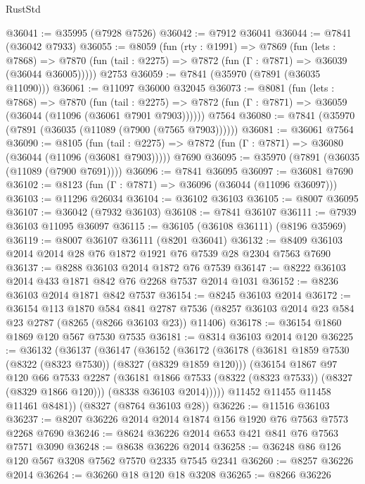\begin{lexlean}{RustStd}
\begin{coremodule}
{\begin{coremodule}
{{{{{{{{{{{{{{{{{{{{{{{{{{{{{{{{{{{{{{{{{{{{{{{{{{{{{{@36041 := @35995 (@7928 @7526)
@36042 := @7912 @36041
@36044 := @7841 (@36042 @7933)
@36055 := @8059
    (fun (rty : @1991) =>
    @7869
      (fun (lets : @7868) =>
      @7870 (fun (tail : @2275) => @7872 (fun (Γ : @7871) => @36039 (@36044 @36005)))))
    @2753
@36059 := @7841 (@35970 (@7891 (@36035 @11090)))
@36061 := @11097 @36000 @32045
@36073 := @8081
    (fun (lets : @7868) =>
    @7870
      (fun (tail : @2275) =>
      @7872 (fun (Γ : @7871) => @36059 (@36044 (@11096 (@36061 @7901 @7903))))))
    @7564
@36080 := @7841 (@35970 (@7891 (@36035 (@11089 (@7900 (@7565 @7903))))))
@36081 := @36061 @7564
@36090 := @8105
    (fun (tail : @2275) => @7872 (fun (Γ : @7871) => @36080 (@36044 (@11096 (@36081 @7903)))))
    @7690
@36095 := @35970 (@7891 (@36035 (@11089 (@7900 @7691))))
@36096 := @7841 @36095
@36097 := @36081 @7690
@36102 := @8123 (fun (Γ : @7871) => @36096 (@36044 (@11096 @36097)))
@36103 := @11296 @26034
@36104 := @36102 @36103
@36105 := @8007 @36095
@36107 := @36042 (@7932 @36103)
@36108 := @7841 @36107
@36111 := @7939 @36103 @11095 @36097
@36115 := @36105 (@36108 @36111) (@8196 @35969)
@36119 := @8007 @36107 @36111 (@8201 @36041)
@36132 := @8409 @36103 @2014 @2014 @28 @76 @1872 @1921 @76 @7539 @28 @2304 @7563 @7690
@36137 := @8288 @36103 @2014 @1872 @76 @7539
@36147 := @8222 @36103 @2014 @433 @1871 @842 @76 @2268 @7537 @2014 @1031
@36152 := @8236 @36103 @2014 @1871 @842 @7537
@36154 := @8245 @36103 @2014
@36172 := @36154
    @113
    @1870
    @584
    @841
    @2787
    @7536
    (@8257 @36103 @2014 @23 @584 @23 @2787 (@8265 (@8266 @36103 @23)) @11406)
@36178 := @36154 @1860 @1869 @120 @567 @7530 @7535
@36181 := @8314 @36103 @2014 @120
@36225 := @36132
    (@36137
      (@36147
        (@36152
          (@36172
            (@36178
              (@36181 @1859 @7530 (@8322 (@8323 @7530)) (@8327 (@8329 @1859 @120)))
              (@36154
                @1867
                @97
                @120
                @66
                @7533
                @2287
                (@36181 @1866 @7533 (@8322 (@8323 @7533)) (@8327 (@8329 @1866 @120)))
                (@8338 @36103 @2014)))))
        @11452
        @11455
        @11458
        @11461
        @8481))
    (@8327 (@8764 @36103 @28))
@36226 := @11516 @36103
@36237 := @8207 @36226 @2014 @2014 @1874 @156 @1920 @76 @7563 @7573 @2268 @7690
@36246 := @8624 @36226 @2014 @653 @421 @841 @76 @7563 @7571 @3090
@36248 := @8638 @36226 @2014
@36258 := @36248 @86 @126 @120 @567 @3208 @7562 @7570 @2335 @7545 @2341
@36260 := @8257 @36226 @2014
@36264 := @36260 @18 @120 @18 @3208
@36265 := @8266 @36226
}}}}}}}}}}}}}}}}}}}}}}}}}}}}}}}}}}}}}}}}}}}}}}}}}}}}}}
\end{coremodule}}
\end{coremodule}
\end{lexlean}
